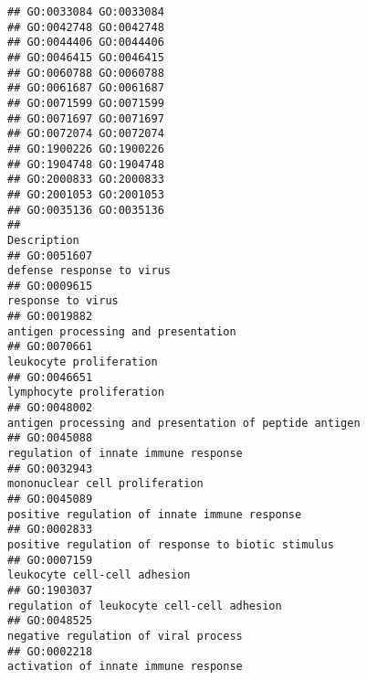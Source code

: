 \documentclass[
]{article}
\begin{document}
\begin{verbatim}
## GO:0033084 GO:0033084
## GO:0042748 GO:0042748
## GO:0044406 GO:0044406
## GO:0046415 GO:0046415
## GO:0060788 GO:0060788
## GO:0061687 GO:0061687
## GO:0071599 GO:0071599
## GO:0071697 GO:0071697
## GO:0072074 GO:0072074
## GO:1900226 GO:1900226
## GO:1904748 GO:1904748
## GO:2000833 GO:2000833
## GO:2001053 GO:2001053
## GO:0035136 GO:0035136
##                                                                                                                                                 Description
## GO:0051607                                                                                                                        defense response to virus
## GO:0009615                                                                                                                                response to virus
## GO:0019882                                                                                                              antigen processing and presentation
## GO:0070661                                                                                                                          leukocyte proliferation
## GO:0046651                                                                                                                         lymphocyte proliferation
## GO:0048002                                                                                           antigen processing and presentation of peptide antigen
## GO:0045088                                                                                                             regulation of innate immune response
## GO:0032943                                                                                                                   mononuclear cell proliferation
## GO:0045089                                                                                                    positive regulation of innate immune response
## GO:0002833                                                                                               positive regulation of response to biotic stimulus
## GO:0007159                                                                                                                     leukocyte cell-cell adhesion
## GO:1903037                                                                                                       regulation of leukocyte cell-cell adhesion
## GO:0048525                                                                                                             negative regulation of viral process
## GO:0002218                                                                                                             activation of innate immune response

\end{verbatim}
\end{document}
